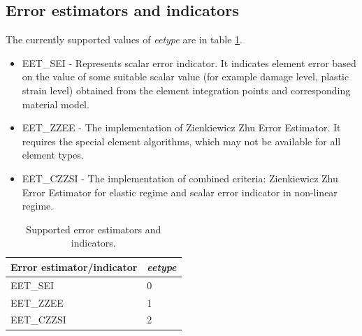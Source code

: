 \documentclass[a4paper]{article}
\newcommand{\param}[1]{{\em #1}}
\begin{document}
\subsection{Error estimators and indicators}
\label{errorestimators}
The currently supported values of \param{eetype} are in table
\ref{eetypestable}.
\begin{itemize}
\item
EET\_SEI - Represents scalar error indicator.
It indicates element error based on the value of some suitable scalar
value (for example damage level, plastic strain level) obtained from the 
element integration points and corresponding material model.
\item 
EET\_ZZEE - The implementation of Zienkiewicz Zhu Error
Estimator. It requires the special element algorithms, which may not
be available for all element types.
\item
EET\_CZZSI - The implementation of combined criteria: Zienkiewicz Zhu Error Estimator for elastic regime and
scalar error indicator in non-linear regime.
\end{itemize}

\begin{table}[h]                                                                
\begin{center}                                                                  
\begin{tabular}{|l|l|}                                                      
\hline                                                                          
Error estimator/indicator & \param{eetype}\\
\hline
EET\_SEI & 0 \\
EET\_ZZEE& 1 \\
EET\_CZZSI& 2\\
\hline
\end{tabular}                                                                   
\caption{Supported error estimators and indicators.}
\label{eetypestable}                                                         
\end{center}                                                                    
\end{table}                                                                     
\end{document}
